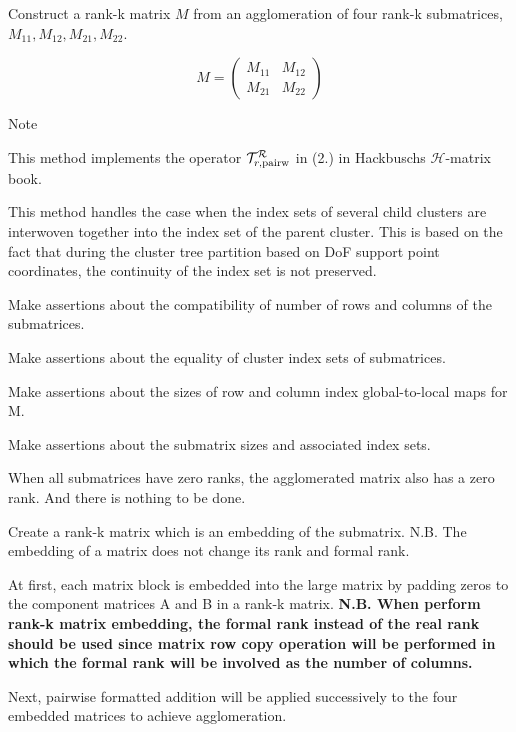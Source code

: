 Construct a rank-\/k matrix $M$ from an agglomeration of four rank-\/k submatrices, $M_{11}, M_{12}, M_{21}, M_{22}$.

\[ M = \begin{pmatrix} M_{11} & M_{12} \\ M_{21} & M_{22} \end{pmatrix} \]


\begin{DoxyDescription}
\item[Note ]
\begin{DoxyEnumerate}
\item This method implements the operator $\mathcal{T}_{r, {\rm pairw}}^{\mathcal{R}}$ in (2.) in Hackbusch\textquotesingle{}s $\mathcal{H}$-\/matrix book.
\item This method handles the case when the index sets of several child clusters are interwoven together into the index set of the parent cluster. This is based on the fact that during the cluster tree partition based on DoF support point coordinates, the continuity of the index set is not preserved.  
\end{DoxyEnumerate}
\end{DoxyDescription}Make assertions about the compatibility of number of rows and columns of the submatrices.

Make assertions about the equality of cluster index sets of submatrices.

Make assertions about the sizes of row and column index global-\/to-\/local maps for {\ttfamily M}.

Make assertions about the submatrix sizes and associated index sets.

When all submatrices have zero ranks, the agglomerated matrix also has a zero rank. And there is nothing to be done.

Create a rank-\/k matrix which is an embedding of the submatrix. N.\+B. The embedding of a matrix does not change its rank and formal rank.

At first, each matrix block is embedded into the large matrix by padding zeros to the component matrices {\ttfamily A} and {\ttfamily B} in a rank-\/k matrix. {\bfseries N.\+B. When perform rank-\/k matrix embedding, the formal rank instead of the real rank should be used since matrix row copy operation will be performed in which the formal rank will be involved as the number of columns.}

Next, pairwise formatted addition will be applied successively to the four embedded matrices to achieve agglomeration.

